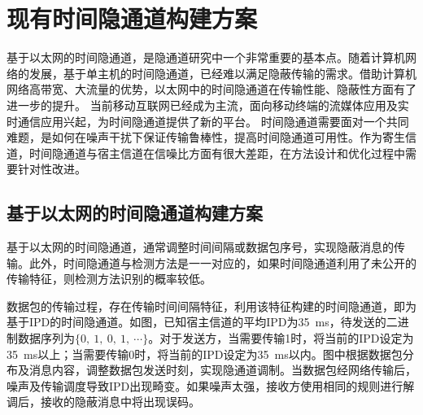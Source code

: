 \section{现有时间隐通道构建方案}
\label{chap:backinfo:ctc}

基于以太网的时间隐通道，是隐通道研究中一个非常重要的基本点。随着计算机网络的发展，基于单主机的时间隐通道，已经难以满足隐蔽传输的需求。借助计算机网络高带宽、大流量的优势，以太网中的时间隐通道在传输性能、隐蔽性方面有了进一步的提升。
当前移动互联网已经成为主流，面向移动终端的流媒体应用及实时通信应用兴起，为时间隐通道提供了新的平台。
时间隐通道需要面对一个共同难题，是如何在噪声干扰下保证传输鲁棒性，提高时间隐通道可用性。作为寄生信道，时间隐通道与宿主信道在信噪比方面有很大差距，在方法设计和优化过程中需要针对性改进。

\subsection{基于以太网的时间隐通道构建方案}
\label{chap:backinfo:ctc:ethernet}
基于以太网的时间隐通道，通常调整时间间隔或数据包序号，实现隐蔽消息的传输。此外，时间隐通道与检测方法是一一对应的，如果时间隐通道利用了未公开的传输特征，则检测方法识别的概率较低。


数据包的传输过程，存在传输时间间隔特征，利用该特征构建的时间隐通道，即为基于IPD的时间隐通道。如图，已知宿主信道的平均IPD为{35\ ms}，待发送的二进制数据序列为$\{0,\ 1,\ 0,\ 1,\ \cdots\}$。对于发送方，当需要传输1时，将当前的IPD设定为{35\ ms}以上；当需要传输0时，将当前的IPD设定为{35\ ms}以内。图中根据数据包分布及消息内容，调整数据包发送时刻，实现隐通道调制。当数据包经网络传输后，噪声及传输调度导致IPD出现畸变。如果噪声太强，接收方使用相同的规则进行解调后，接收的隐蔽消息中将出现误码。

